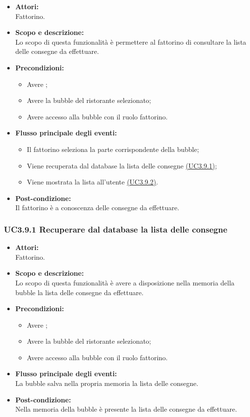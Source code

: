 \begin{itemize}
	\item \textbf{Attori:}
	\\Fattorino.
	\item \textbf{Scopo e descrizione:} 
	\\Lo scopo di questa funzionalità è permettere al fattorino di consultare la lista delle consegne da effettuare.
	\item \textbf{Precondizioni:}
	\begin{itemize}
		\item Avere ;
		\item Avere la bubble del ristorante selezionato;
		\item Avere accesso alla bubble con il ruolo fattorino.
	\end{itemize}
	\item \textbf{Flusso principale degli eventi:}
	\begin{itemize}
		\item Il fattorino seleziona la parte corrispondente della bubble;
		\item Viene recuperata dal database la lista delle consegne \hyperref[UC3.9.1]{(UC3.9.1)};
		\item Viene mostrata la lista all’utente \hyperref[UC3.9.2]{(UC3.9.2)}.
	\end{itemize}
	\item \textbf{Post-condizione:}
	\\Il fattorino è a conoscenza delle consegne da effettuare.
\end{itemize}

\subsubsection{UC3.9.1 Recuperare dal database la lista delle consegne} \label{UC3.9.1}

\begin{itemize}
	\item \textbf{Attori:}
	\\Fattorino.
	\item \textbf{Scopo e descrizione:} 
	\\Lo scopo di questa funzionalità è avere a disposizione nella memoria della bubble la lista delle consegne da effettuare.
	\item \textbf{Precondizioni:}
	\begin{itemize}
		\item Avere ;
		\item Avere la bubble del ristorante selezionato;
		\item Avere accesso alla bubble con il ruolo fattorino.
	\end{itemize}
	\item \textbf{Flusso principale degli eventi:}
	\\La bubble salva nella propria memoria la lista delle consegne.
	\item \textbf{Post-condizione:}
	\\Nella memoria della bubble è presente la lista delle consegne da effettuare.
\end{itemize}

